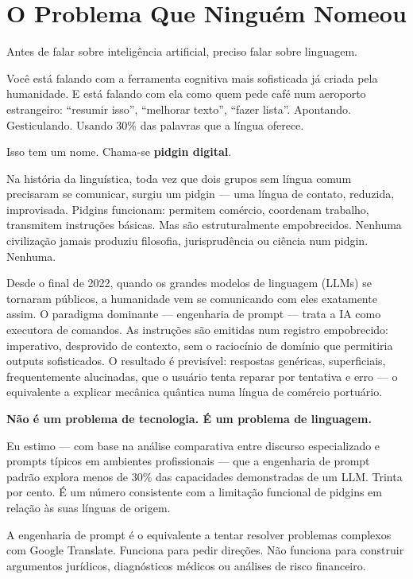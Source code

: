 \documentclass[12pt,a4paper]{article}
\begin{document}
\vfill
\tableofcontents
\newpage

\section{O Problema Que Ninguém Nomeou}
\label{sec:problema}

Antes de falar sobre inteligência artificial, preciso falar sobre linguagem.

Você está falando com a ferramenta cognitiva mais sofisticada já criada pela humanidade. E está falando com ela como quem pede café num aeroporto estrangeiro: ``resumir isso'', ``melhorar texto'', ``fazer lista''. Apontando. Gesticulando. Usando 30\% das palavras que a língua oferece.

Isso tem um nome. Chama-se \textbf{pidgin digital}.

Na história da linguística, toda vez que dois grupos sem língua comum precisaram se comunicar, surgiu um pidgin --- uma língua de contato, reduzida, improvisada. Pidgins funcionam: permitem comércio, coordenam trabalho, transmitem instruções básicas. Mas são estruturalmente empobrecidos. Nenhuma civilização jamais produziu filosofia, jurisprudência ou ciência num pidgin. Nenhuma.

Desde o final de 2022, quando os grandes modelos de linguagem (LLMs) se tornaram públicos, a humanidade vem se comunicando com eles exatamente assim. O paradigma dominante --- engenharia de prompt --- trata a IA como executora de comandos. As instruções são emitidas num registro empobrecido: imperativo, desprovido de contexto, sem o raciocínio de domínio que permitiria outputs sofisticados. O resultado é previsível: respostas genéricas, superficiais, frequentemente alucinadas, que o usuário tenta reparar por tentativa e erro --- o equivalente a explicar mecânica quântica numa língua de comércio portuário.

\textbf{Não é um problema de tecnologia. É um problema de linguagem.}

Eu estimo --- com base na análise comparativa entre discurso especializado e prompts típicos em ambientes profissionais --- que a engenharia de prompt padrão explora menos de 30\% das capacidades demonstradas de um LLM. Trinta por cento. É um número consistente com a limitação funcional de pidgins em relação às suas línguas de origem.

A engenharia de prompt é o equivalente a tentar resolver problemas complexos com Google Translate. Funciona para pedir direções. Não funciona para construir argumentos jurídicos, diagnósticos médicos ou análises de risco financeiro.
\end{document}

